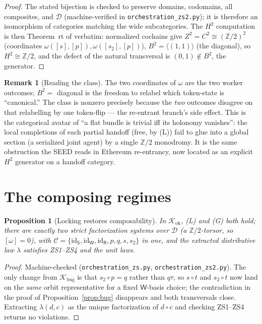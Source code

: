 \documentclass[11pt]{article}
\newtheorem{proposition}[theorem]{Proposition}
\theoremstyle{definition}
\newtheorem{remark}[theorem]{Remark}
\newcommand{\id}{\mathrm{id}}
\newcommand{\C}{\mathcal{C}}
\newcommand{\D}{\mathcal{D}}
\newcommand{\K}{\mathcal{K}}
\newcommand{\Sup}{\mathsf{S}}
\newcommand{\Wk}{\mathsf{W}}
\newcommand{\Rt}{\mathsf{R}}
\begin{document}
\begin{proof}
The stated bijection is checked to preserve domains, codomains, all composites, and
$\D$ (machine-verified in \texttt{orchestration\_zs2.py}); it is therefore an
isomorphism of categories matching the wide subcategories. The $H^2$ computation is
then Theorem~rt of \cite{gobstr} verbatim: normalized cochains give
$Z^2=C^2\cong(\mathbb Z/2)^2$ (coordinates $\omega([s],[p]),\omega([s_2],[p])$),
$B^2=\langle(1,1)\rangle$ (the diagonal), so $H^2\cong\mathbb Z/2$, and the defect of
the natural transversal is $(0,1)\notin B^2$, the generator.
\end{proof}

\begin{remark}[Reading the class]
The two coordinates of $\omega$ are the two worker outcomes; $B^2=$ diagonal is the
freedom to relabel which token-state is ``canonical.'' The class is nonzero precisely
because the \emph{two} outcomes disagree on that relabelling by one token-flip --- the
re-entrant branch's side effect. This is the categorical avatar of ``a flat bundle
is trivial iff its holonomy vanishes'': the local completions of each partial handoff
(free, by (L)) fail to glue into a global section (a serialized joint agent) by a
single $\mathbb Z/2$ monodromy. It is the same obstruction the SEED reads in Ethereum
re-entrancy, now located as an explicit $H^2$ generator on a handoff category.
\end{remark}

\section{The composing regimes}\label{sec:ok}

\begin{proposition}[Locking restores composability]\label{prop:ok}
In $\K_{\mathrm{ok}}$, \textnormal{(L)} and \textnormal{(G)} both hold; there are
exactly two strict factorization systems over $\D$ (a $\mathbb Z/2$-torsor, so
$[\omega]=0$), with $\C=\{\id_\Sup,\id_\Wk,\id_\Rt,p,q,s,s_2\}$ in one, and the
extracted distributive law $\lambda$ satisfies ZS1--ZS4 and the unit laws.
\end{proposition}

\begin{proof}
Machine-checked (\texttt{orchestration\_zs.py}, \texttt{orchestration\_zs2.py}). The
only change from $\K_{\mathrm{bug}}$ is that $s_2\circ p=q$ rather than $q\tau$, so
$s\circ t$ and $s_2\circ t$ now land on the \emph{same} orbit representative for a
fixed $\Wk$-basis choice; the contradiction in the proof of
Proposition~\ref{prop:bug} disappears and both transversals close. Extracting
$\lambda(d,c)$ as the unique factorization of $d\circ c$ and checking ZS1--ZS4
returns no violations.
\end{proof}
\end{document}
